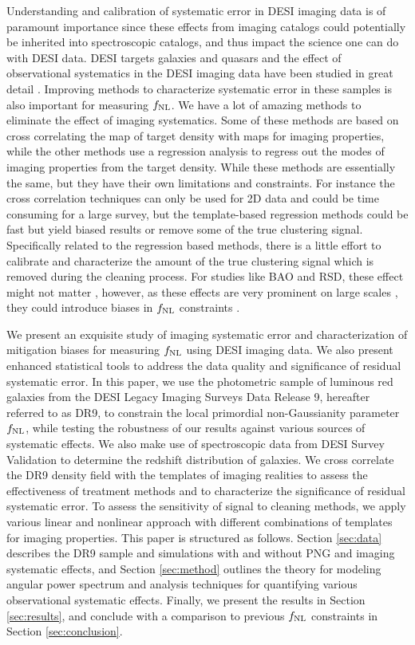  Understanding and calibration of systematic error in DESI imaging data is of paramount importance since these effects from imaging catalogs could potentially be inherited into spectroscopic catalogs, and thus impact the science one can do with DESI data. DESI targets galaxies and quasars and the effect of observational systematics in the DESI imaging data have been studied in great detail \cite[see, e.g.,][]{zhou2021clustering, chaussidon2022angular}. Improving methods to characterize systematic error in these samples is also important for measuring $f_{\rm NL}$. We have a lot of amazing methods to eliminate the effect of imaging systematics. Some of these methods are based on cross correlating the map of target density with maps for imaging properties, while the other methods use a regression analysis to regress out the modes of imaging properties from the target density. While these methods are essentially the same, but they have their own limitations and constraints. For instance the cross correlation techniques can only be used for 2D data and could be time consuming for a large survey, but the template-based regression methods could be fast but yield biased results or remove some of the true clustering signal. Specifically related to the regression based methods, there is a little effort to calibrate and characterize the amount of the true clustering signal which is removed during the cleaning process. For studies like BAO and RSD, these effect might not matter \citep{merz2021clustering}, however, as these effects are very prominent on large scales \citep{rezaie2021primordial}, they could introduce biases in $f_{\rm NL}$ constraints \citep{mueller2022primordial}.  
 
We present an exquisite study of imaging systematic error and characterization of mitigation biases for measuring $f_{\rm NL}$ using DESI imaging data. We also present enhanced statistical tools to address the data quality and significance of residual systematic error. In this paper, we use the photometric sample of luminous red galaxies from the DESI Legacy Imaging Surveys Data Release 9, hereafter referred to as DR9, to constrain the local primordial non-Gaussianity parameter $f_{\rm NL}$, while testing the robustness of our results against various sources of systematic effects. We also make use of spectroscopic data from DESI Survey Validation to determine the redshift distribution of galaxies. We cross correlate the DR9 density field with the templates of imaging realities to assess the effectiveness of treatment methods and to characterize the significance of residual systematic error. To assess the sensitivity of signal to cleaning methods, we apply various linear and nonlinear approach with different combinations of templates for imaging properties. This paper is structured as follows. Section \ref{sec:data} describes the DR9 sample and simulations with and without PNG and imaging systematic effects, and Section \ref{sec:method} outlines the theory for modeling angular power spectrum and analysis techniques for quantifying various observational systematic effects. Finally, we present the results in Section \ref{sec:results}, and conclude with a comparison to previous $f_{\rm NL}$ constraints in Section \ref{sec:conclusion}.